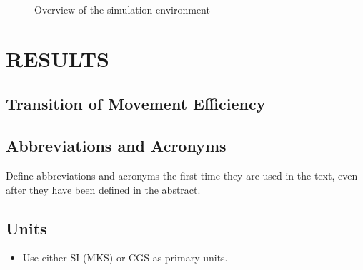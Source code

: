\documentclass[letterpaper, 10 pt, conference]{ieeeconf}  %
\begin{document}
\begin{figure}[thpb]
   \centering
   \caption{Overview of the simulation environment}
   \label{fig:sim_env}
\end{figure}

\section{RESULTS}
\subsection{Transition of Movement Efficiency}


\subsection{Abbreviations and Acronyms} 
Define abbreviations and acronyms the first time they are used in the text, even after they have been defined in the abstract. 

\subsection{Units}

\begin{itemize}

\item Use either SI (MKS) or CGS as primary units. 

\end{itemize}
\end{document}
